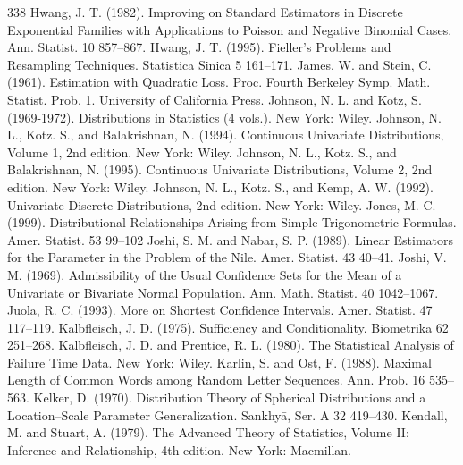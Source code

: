 \begin{thebibliography}{338}
\label{bib:source174} Hwang, J. T. (1982). Improving on Standard Estimators in Discrete Exponential Families with Applications to Poisson and Negative Binomial Cases. Ann. Statist. 10 857–867.
\label{bib:source175} Hwang, J. T. (1995). Fieller’s Problems and Resampling Techniques. Statistica Sinica 5 161–171.
\label{bib:source176} James, W. and Stein, C. (1961). Estimation with Quadratic Loss. Proc. Fourth Berkeley Symp. Math. Statist. Prob. 1. University of California Press.
\label{bib:source177} Johnson, N. L. and Kotz, S. (1969-1972). Distributions in Statistics (4 vols.). New York: Wiley.
\label{bib:source178} Johnson, N. L., Kotz. S., and Balakrishnan, N. (1994). Continuous Univariate Distributions, Volume 1, 2nd edition. New York: Wiley.
\label{bib:source179} Johnson, N. L., Kotz. S., and Balakrishnan, N. (1995). Continuous Univariate Distributions, Volume 2, 2nd edition. New York: Wiley.
\label{bib:source180} Johnson, N. L., Kotz. S., and Kemp, A. W. (1992). Univariate Discrete Distributions, 2nd edition. New York: Wiley.
\label{bib:source181} Jones, M. C. (1999). Distributional Relationships Arising from Simple Trigonometric Formulas. Amer. Statist. 53 99–102
\label{bib:source182} Joshi, S. M. and Nabar, S. P. (1989). Linear Estimators for the Parameter in the Problem of the Nile. Amer. Statist. 43 40–41.
\label{bib:source183} Joshi, V. M. (1969). Admissibility of the Usual Confidence Sets for the Mean of a Univariate or Bivariate Normal Population. Ann. Math. Statist. 40 1042–1067.
\label{bib:source184} Juola, R. C. (1993). More on Shortest Confidence Intervals. Amer. Statist. 47 117–119.
\label{bib:source185} Kalbfleisch, J. D. (1975). Sufficiency and Conditionality. Biometrika 62 251–268.
\label{bib:source186} Kalbfleisch, J. D. and Prentice, R. L. (1980). The Statistical Analysis of Failure Time Data. New York: Wiley.
\label{bib:source187} Karlin, S. and Ost, F. (1988). Maximal Length of Common Words among Random Letter Sequences. Ann. Prob. 16 535–563.
\label{bib:source188} Kelker, D. (1970). Distribution Theory of Spherical Distributions and a Location–Scale Parameter Generalization. Sankhyā, Ser. A 32 419–430.
\label{bib:source189} Kendall, M. and Stuart, A. (1979). The Advanced Theory of Statistics, Volume II: Inference and Relationship, 4th edition. New York: Macmillan.

\end{thebibliography}
